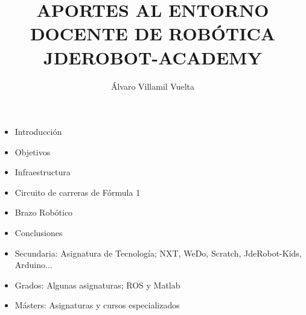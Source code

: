 \documentclass[notes,slidesec,a4]{seminar}
\title{APORTES AL ENTORNO DOCENTE DE
ROBÓTICA JDEROBOT-ACADEMY}
\author{Álvaro Villamil Vuelta}
\begin{document}
\maketitle


\begin{hslide}
	\begin{itemize}
		\item Introducción 
		\item Objetivos
		\item Infraestructura
		\item Circuito de carreras de Fórmula 1
		\item Brazo Robótico
		\item Conclusiones
	\end{itemize}
\end{hslide}

\begin{hslide}
	\begin{itemize}
		\item Secundaria: Asignatura de Tecnología; NXT, WeDo, Scratch, JdeRobot-Kids, Arduino...
		\item Grados: Algunas asignaturas; ROS y Matlab
		\item Másters: Asignaturas y cursos especializados
	\end{itemize}
\end{hslide}
\end{document}
